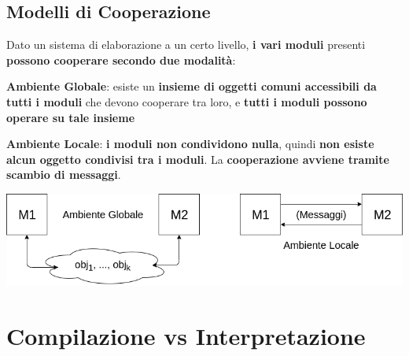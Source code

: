 \documentclass[10pt]{report}
\begin{document}
\subsection{Modelli di Cooperazione}
Dato un sistema di elaborazione a un certo livello, \textbf{i vari moduli} presenti \textbf{possono cooperare secondo due modalità}:
\begin{list}{}{}
	\item \textbf{Ambiente Globale}: esiste un \textbf{insieme di oggetti comuni accessibili da tutti i moduli} che devono cooperare tra loro, e \textbf{tutti i moduli possono operare su tale insieme}
	\item \textbf{Ambiente Locale}: \textbf{i moduli non condividono nulla}, quindi \textbf{non esiste alcun oggetto condivisi tra i moduli}. La \textbf{cooperazione avviene tramite scambio di messaggi}.
\end{list}
\begin{center}
\includegraphics[scale=0.5]{modellicoop.png}
\end{center}
\pagebreak
\section{Compilazione vs Interpretazione}
\end{document}
